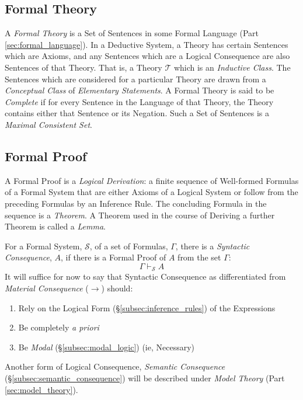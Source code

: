 \documentclass{article}
\begin{document}
\subsection{Formal Theory}\label{subsec:formal_theory}

A \emph{Formal Theory} is a Set of Sentences in some Formal Language
(Part \ref{sec:formal_language}). In a Deductive System, a Theory has
certain Sentences which are Axioms, and any Sentences which are a
Logical Consequence are also Sentences of that Theory. That is, a
Theory $\mathcal{T}$ which is an \emph{Inductive Class}. The Sentences
which are considered for a particular Theory are drawn from a
\emph{Conceptual Class} of \emph{Elementary Statements}. A Formal
Theory is said to be \emph{Complete} if for every Sentence in the
Language of that Theory, the Theory contains either that Sentence or
its Negation. Such a Set of Sentences is a \emph{Maximal Consistent
  Set}.

\subsection{Formal Proof} \label{subsec:formal_proof}

A Formal Proof is a \emph{Logical Derivation}: a finite sequence of
Well-formed Formulas of a Formal System that are either Axioms of a
Logical System or follow from the preceding Formulas by an Inference
Rule. The concluding Formula in the sequence is a \emph{Theorem}. A
Theorem used in the course of Deriving a further Theorem is called a
\emph{Lemma}.

For a Formal System, $\mathcal{S}$, of a set of Formulas, $\Gamma$,
there is a \emph{Syntactic Consequence}, $A$, if there is a
Formal Proof of $A$ from the set $\Gamma$:
\[
    \Gamma \vdash_{\mathcal{S}} A
\]
It will suffice for now to say that Syntactic Consequence as
differentiated from \emph{Material Consequence} ($\rightarrow$)
should:

\begin{enumerate}
\item Rely on the Logical Form (\S\ref{subsec:inference_rules}) of the
  Expressions
\item Be completely \emph{a priori}
\item Be \emph{Modal} (\S\ref{subsec:modal_logic}) (ie, Necessary)
\end{enumerate}
Another form of Logical Consequence, \emph{Semantic Consequence}
(\S\ref{subsec:semantic_consequence}) will be described under
\emph{Model Theory} (Part \ref{sec:model_theory}).
\end{document}
